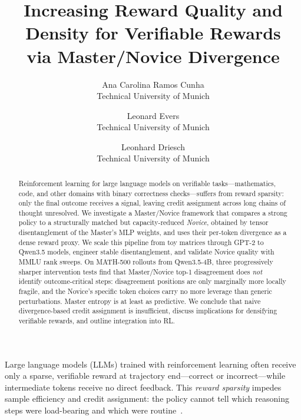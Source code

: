 \documentclass[times, 10pt,twocolumn]{article}
\begin{document}
\title{Increasing Reward Quality and Density for Verifiable Rewards\\
       via Master/Novice Divergence}

\author{Ana Carolina Ramos Cunha\\
Technical University of Munich\\
\and
Leonard Evers\\
Technical University of Munich\\
\and
Leonhard Driesch\\
Technical University of Munich\\
}

\maketitle
\thispagestyle{empty}

\begin{abstract}
Reinforcement learning for large language models on verifiable tasks---mathematics,
code, and other domains with binary correctness checks---suffers from reward
sparsity: only the final outcome receives a signal, leaving credit assignment
across long chains of thought unresolved. We investigate a Master/Novice
framework that compares a strong policy to a structurally matched but
capacity-reduced \emph{Novice}, obtained by tensor disentanglement of the
Master's MLP weights, and uses their per-token divergence as a dense reward
proxy. We scale this pipeline from toy matrices through GPT-2 to Qwen3.5 models,
engineer stable disentanglement, and validate Novice quality with MMLU rank
sweeps. On MATH-500 rollouts from Qwen3.5-4B, three progressively sharper
intervention tests find that Master/Novice top-1 disagreement does \emph{not}
identify outcome-critical steps: disagreement positions are only marginally more
locally fragile, and the Novice's specific token choices carry no more leverage
than generic perturbations. Master entropy is at least as predictive. We
conclude that naive divergence-based credit assignment is insufficient, discuss
implications for densifying verifiable rewards, and outline integration into RL.
\end{abstract}



Large language models (LLMs) trained with reinforcement learning often receive only a sparse, verifiable reward at trajectory end---correct
or incorrect---while intermediate tokens receive no direct feedback. This
\emph{reward sparsity} impedes sample efficiency and credit assignment: the
policy cannot tell which reasoning steps were load-bearing and which were
routine~\cite{cui2025prime}.
\end{document}
